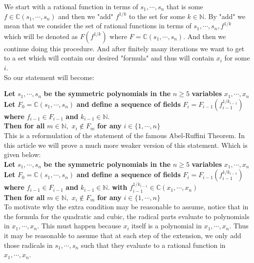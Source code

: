 We start with a rational function in terms of $s_1,\cdots,s_n$ that is some $f\in\mathbb{C}(s_1,\cdots,s_n)$ and then we "add" $f^{1/k}$ to the set for some $k\in\mathbb{N}$. By "add" we mean that we consider the set of rational functions in terms of $s_1,\cdots,s_n,f^{1/k}$ which will be denoted as $F(f^{1/k})$ where $F=\mathbb{C}(s_1,\cdots,s_n)$. And then we continue doing this procedure. And after finitely many iterations we want to get to a set which will contain our desired "formula" and thus will contain $x_i$ for some $i$.\\

So our statement will become:

\textbf{Let } $s_1,\cdots,s_n$ \textbf{ be the symmetric polynomials in the } $n\geq 5$ \textbf{ variables } $x_1,\cdots,x_n$ \\ \textbf{Let }  $F_0=\mathbb{C}(s_1,\cdots,s_n)$ \textbf{ and define a sequence of fields } $F_i=F_{i-1}(f_{i-1}^{1/k_{i-1}})$ \textbf{ where } $f_{i-1}\in F_{i-1}$ \textbf{ and } $k_{i-1}\in\mathbb{N}.$ \\
 \textbf{ Then for all } $m\in\mathbb{N},$
$x_i\notin F_m$ \textbf{ for any } $i\in\{1,\cdots,n\}$\\

This is a reformulation of the statement of the famous Abel-Ruffini Theorem. In this article we will prove a much more weaker version of this statement. Which is given below:\\

\textbf{Let } $s_1,\cdots,s_n$ \textbf{ be the symmetric polynomials in the } $n\geq 5$ \textbf{ variables } $x_1,\cdots,x_n$ \\ \textbf{Let }  $F_0=\mathbb{C}(s_1,\cdots,s_n)$ \textbf{ and define a sequence of fields } $F_i=F_{i-1}(f_{i-1}^{1/k_{i-1}})$ \textbf{ where } $f_{i-1}\in F_{i-1}$ \textbf{ and } $k_{i-1}\in\mathbb{N}.$ \textbf{ with } $f_{i-1}^{1/k_{i-1}}\in\mathbb{C}(x_1,\cdots,x_n)$ \\
 \textbf{ Then for all } $m\in\mathbb{N},$
$x_i\notin F_m$ \textbf{ for any } $i\in\{1,\cdots,n\}$\\

To motivate why the extra condition may be reasonable to assume, notice that in the formula for the quadratic and cubic, the radical parts evaluate to polynomials in $x_1,\cdots,x_n$. This must happen because $x_i$ itself is a polynomial in $x_1,\cdots,x_n$. Thus it may be reasonable to assume that at each step of the extension, we only add those radicals in $s_1,\cdots,s_n$ such that they evaluate to a rational function in $x_1,\cdots,x_n$.

